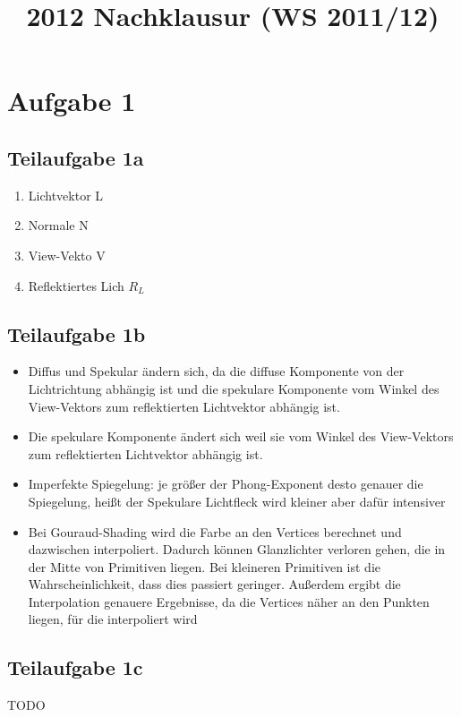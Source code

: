 \documentclass[a4paper]{scrartcl}
\begin{document}
\title{2012 Nachklausur (WS 2011/12)}

\setcounter{section}{1}
\section*{Aufgabe 1}
\subsection*{Teilaufgabe 1a}
\begin{enumerate}
    \item Lichtvektor L
    \item Normale N
    \item View-Vekto V
    \item Reflektiertes Lich $R_L$
\end{enumerate}


\subsection*{Teilaufgabe 1b}
\begin{itemize}
    \item Diffus und Spekular ändern sich, da die diffuse Komponente von der Lichtrichtung abhängig ist und die spekulare Komponente vom Winkel des View-Vektors zum reflektierten Lichtvektor abhängig ist.
    \item Die spekulare Komponente ändert sich weil sie vom Winkel des View-Vektors zum reflektierten Lichtvektor abhängig ist.
    \item Imperfekte Spiegelung: je größer der Phong-Exponent desto genauer die Spiegelung, heißt der Spekulare Lichtfleck wird kleiner aber dafür intensiver
    \item Bei Gouraud-Shading wird die Farbe an den Vertices berechnet und dazwischen interpoliert. Dadurch können Glanzlichter verloren gehen, die in der Mitte von Primitiven liegen. Bei kleineren Primitiven ist die Wahrscheinlichkeit, dass dies passiert geringer. Außerdem ergibt die Interpolation genauere Ergebnisse, da die Vertices näher an den Punkten liegen, für die interpoliert wird
\end{itemize}

\subsection*{Teilaufgabe 1c}
TODO
\end{document}
